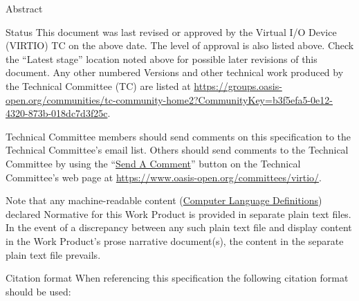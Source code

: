 \begin{titlepage}
\vfill\newpage

\begin{oasistitlesection}{Abstract}

\end{oasistitlesection}

\begin{oasistitlesection}{Status}
This document was last revised or approved by the Virtual I/O Device
(VIRTIO) TC on the above date. The level of approval is also listed above. Check the ``Latest stage'' location noted above for possible later revisions of this document.
Any other numbered Versions and other
technical work produced by the Technical Committee (TC) are
listed at
\url{https://groups.oasis-open.org/communities/tc-community-home2?CommunityKey=b3f5efa5-0e12-4320-873b-018dc7d3f25c}.

Technical Committee members should send comments on this
specification to the Technical Committee’s email list. Others
should send comments to the Technical Committee by using the
``\href{https://www.oasis-open.org/committees/comments/form.php?wg_abbrev=virtio}{Send
A Comment}'' button on the Technical Committee’s web page at
\url{https://www.oasis-open.org/committees/virtio/}.



Note that any machine-readable content
(\href{https://www.oasis-open.org/policies-guidelines/tc-process-2017-05-26/#wpComponentsCompLang}
{Computer Language Definitions}) declared Normative for this Work
Product is provided in separate plain text files. In the event of
a discrepancy between any such plain text file and display
content in the Work Product's prose narrative document(s), the
content in the separate plain text file prevails.

\end{oasistitlesection}


\begin{oasistitlesection}{Citation format}
When referencing this specification the following citation format should be used:\newline


\end{oasistitlesection}
\end{titlepage}

